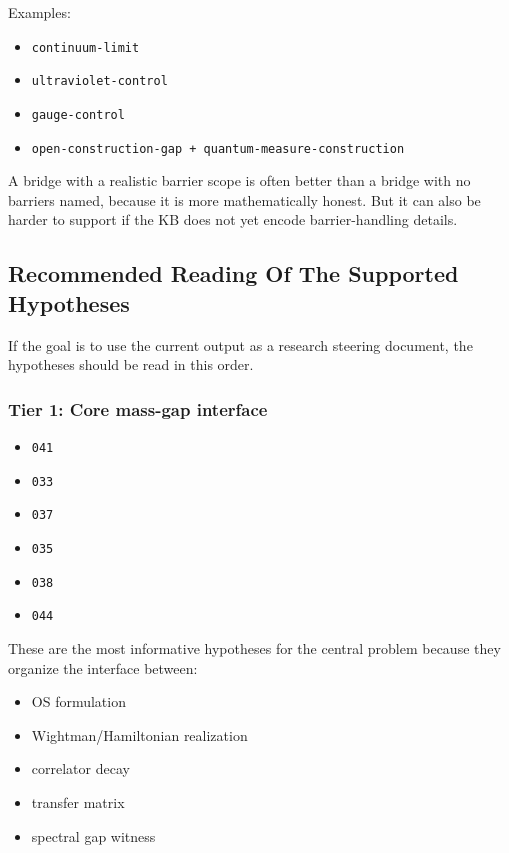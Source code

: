 \documentclass[
]{article}
\providecommand{\tightlist}{%
  \setlength{\itemsep}{0pt}\setlength{\parskip}{0pt}}
\begin{document}
Examples:

\begin{itemize}
\tightlist
\item
  \texttt{continuum-limit}
\item
  \texttt{ultraviolet-control}
\item
  \texttt{gauge-control}
\item
  \texttt{open-construction-gap\ +\ quantum-measure-construction}
\end{itemize}

A bridge with a realistic barrier scope is often better than a bridge
with no barriers named, because it is more mathematically honest. But it
can also be harder to support if the KB does not yet encode
barrier-handling details.

\subsection{Recommended Reading Of The Supported
Hypotheses}\label{recommended-reading-of-the-supported-hypotheses}

If the goal is to use the current output as a research steering
document, the hypotheses should be read in this order.

\subsubsection{Tier 1: Core mass-gap
interface}\label{tier-1-core-mass-gap-interface}

\begin{itemize}
\tightlist
\item
  \texttt{041}
\item
  \texttt{033}
\item
  \texttt{037}
\item
  \texttt{035}
\item
  \texttt{038}
\item
  \texttt{044}
\end{itemize}

These are the most informative hypotheses for the central problem
because they organize the interface between:

\begin{itemize}
\tightlist
\item
  OS formulation
\item
  Wightman/Hamiltonian realization
\item
  correlator decay
\item
  transfer matrix
\item
  spectral gap witness
\end{itemize}
\end{document}

